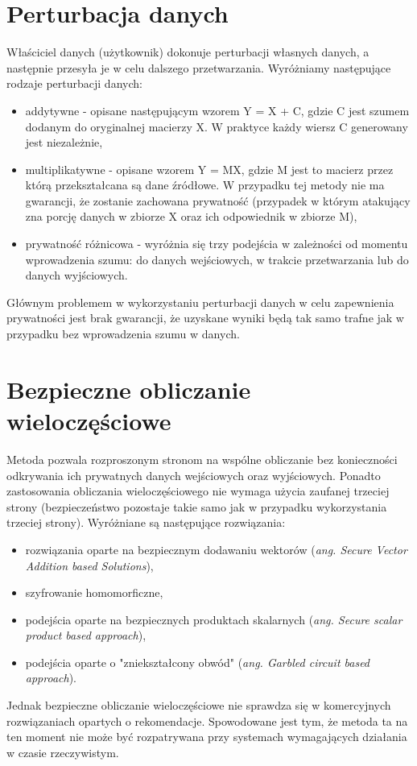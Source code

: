 \section{Perturbacja danych}
Właściciel danych (użytkownik) dokonuje perturbacji własnych danych, a następnie przesyła je w celu dalszego przetwarzania.
Wyróżniamy następujące rodzaje perturbacji danych:
\begin{itemize}
    \item addytywne - opisane następującym wzorem 
    Y = X + C, gdzie C jest szumem dodanym do oryginalnej macierzy X. W praktyce każdy wiersz C generowany jest niezależnie,
    \item multiplikatywne - opisane wzorem Y = MX, gdzie M jest to macierz przez którą przekształcana są dane źródłowe. W przypadku tej metody nie ma gwarancji, że zostanie zachowana prywatność (przypadek w którym atakujący zna porcję danych w zbiorze X oraz ich odpowiednik w zbiorze M),
    \item prywatność różnicowa - wyróżnia się trzy podejścia w zależności od momentu wprowadzenia szumu: do danych wejściowych, w trakcie przetwarzania lub do danych wyjściowych.
\end{itemize}

Głównym problemem w wykorzystaniu perturbacji danych w celu zapewnienia prywatności jest brak gwarancji, że uzyskane wyniki będą tak samo trafne jak w przypadku bez wprowadzenia szumu w danych.

\section{Bezpieczne obliczanie wieloczęściowe}

Metoda pozwala rozproszonym stronom na wspólne obliczanie bez konieczności odkrywania ich prywatnych danych wejściowych oraz wyjściowych. Ponadto zastosowania obliczania wieloczęściowego nie wymaga użycia zaufanej trzeciej strony (bezpieczeństwo pozostaje takie samo jak w przypadku wykorzystania trzeciej strony). 
Wyróżniane są następujące rozwiązania:
\begin{itemize}
    \item rozwiązania oparte na bezpiecznym dodawaniu wektorów (\textit{ang. Secure Vector Addition based Solutions}),
    \item szyfrowanie homomorficzne,
    \item podejścia oparte na bezpiecznych produktach skalarnych (\textit{ang. Secure scalar product based approach}),
    \item podejścia oparte o "zniekształcony obwód" (\textit{ang. Garbled circuit based approach}).
\end{itemize}

Jednak bezpieczne obliczanie wieloczęściowe nie sprawdza się w komercyjnych rozwiązaniach opartych o rekomendacje. Spowodowane jest tym, że metoda ta na ten moment nie może być rozpatrywana przy systemach wymagających działania w czasie rzeczywistym. \cite{secureMultipartyComputation}
